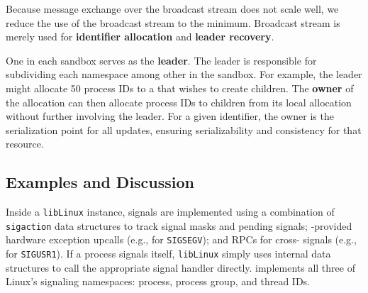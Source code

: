Because message exchange over the broadcast stream does not scale well,
we reduce the use of the broadcast stream to the minimum.
Broadcast stream is merely used for {\bf \picoproc{} identifier allocation}
and {\bf leader recovery}.

One \picoproc{} in each sandbox serves as the {\bf leader}.
The leader is responsible for subdividing each namespace among other \picoprocs{} 
in the sandbox.
For example, the leader might allocate 50 process IDs to a \picoproc{}
that wishes to create children.  The {\bf owner} of the allocation can then allocate process IDs
to children from its local allocation without further involving the leader.
For a given identifier, the owner is the serialization point for all updates,
ensuring serializability and consistency for that resource.

\subsection{Examples and Discussion}

 Inside a {\tt libLinux} instance, signals are implemented using a combination of 
{\tt sigaction} data structures %
to track signal masks and pending signals;
\pal{}-provided hardware exception upcalls (e.g., for {\tt SIGSEGV});
and  RPCs for cross-\picoproc{} signals (e.g., for  {\tt SIGUSR1}).
If a process signals itself, {\tt libLinux} simply uses internal data structures
to call the appropriate signal handler directly.
\sysname{} implements all three of Linux's signaling namespaces:
process, process group, and thread IDs.

